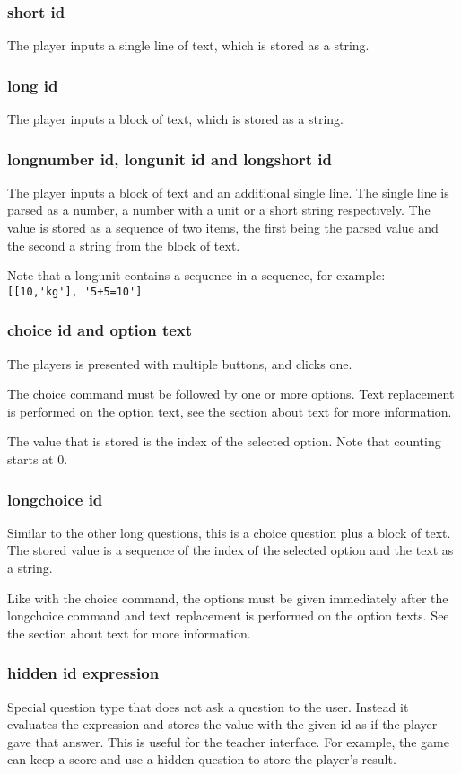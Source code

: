 \documentclass{article}
\begin{document}
\subsubsection{short id}
The player inputs a single line of text, which is stored as a string.

\subsubsection{long id}
The player inputs a block of text, which is stored as a string.

\subsubsection{longnumber id, longunit id and longshort id}
The player inputs a block of text and an additional single line. The single
line is parsed as a number, a number with a unit or a short string
respectively. The value is stored as a sequence of two items, the first being
the parsed value and the second a string from the block of text.

Note that a longunit contains a sequence in a sequence, for example:
\verb-[[10,'kg'], '5+5=10']-

\subsubsection{choice id and option text}
The players is presented with multiple buttons, and clicks one.

The choice command must be followed by one or more options. Text replacement is
performed on the option text, see the section about text for more information.

The value that is stored is the index of the selected option. Note that
counting starts at 0.

\subsubsection{longchoice id}
Similar to the other long questions, this is a choice question plus a block of
text. The stored value is a sequence of the index of the selected option and
the text as a string.

Like with the choice command, the options must be given immediately after the
longchoice command and text replacement is performed on the option texts. See
the section about text for more information.

\subsubsection{hidden id expression}
Special question type that does not ask a question to the user. Instead it
evaluates the expression and stores the value with the given id as if the
player gave that answer.  This is useful for the teacher interface. For
example, the game can keep a score and use a hidden question to store the
player's result.
\end{document}
